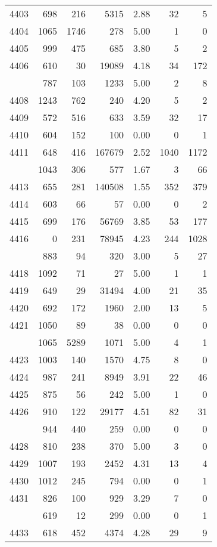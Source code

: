 \documentclass[
]{article}
\begin{document}
\begin{table}
\begin{tabular}[t]{lrrrrrr}
4403 & 698 & 216 & 5315 & 2.88 & 32 & 5\\
4404 & 1065 & 1746 & 278 & 5.00 & 1 & 0\\
4405 & 999 & 475 & 685 & 3.80 & 5 & 2\\
4406 & 610 & 30 & 19089 & 4.18 & 34 & 172\\
\addlinespace
4407 & 787 & 103 & 1233 & 5.00 & 2 & 8\\
4408 & 1243 & 762 & 240 & 4.20 & 5 & 2\\
4409 & 572 & 516 & 633 & 3.59 & 32 & 17\\
4410 & 604 & 152 & 100 & 0.00 & 0 & 1\\
4411 & 648 & 416 & 167679 & 2.52 & 1040 & 1172\\
\addlinespace
4412 & 1043 & 306 & 577 & 1.67 & 3 & 66\\
4413 & 655 & 281 & 140508 & 1.55 & 352 & 379\\
4414 & 603 & 66 & 57 & 0.00 & 0 & 2\\
4415 & 699 & 176 & 56769 & 3.85 & 53 & 177\\
4416 & 0 & 231 & 78945 & 4.23 & 244 & 1028\\
\addlinespace
4417 & 883 & 94 & 320 & 3.00 & 5 & 27\\
4418 & 1092 & 71 & 27 & 5.00 & 1 & 1\\
4419 & 649 & 29 & 31494 & 4.00 & 21 & 35\\
4420 & 692 & 172 & 1960 & 2.00 & 13 & 5\\
4421 & 1050 & 89 & 38 & 0.00 & 0 & 0\\
\addlinespace
4422 & 1065 & 5289 & 1071 & 5.00 & 4 & 1\\
4423 & 1003 & 140 & 1570 & 4.75 & 8 & 0\\
4424 & 987 & 241 & 8949 & 3.91 & 22 & 46\\
4425 & 875 & 56 & 242 & 5.00 & 1 & 0\\
4426 & 910 & 122 & 29177 & 4.51 & 82 & 31\\
\addlinespace
4427 & 944 & 440 & 259 & 0.00 & 0 & 0\\
4428 & 810 & 238 & 370 & 5.00 & 3 & 0\\
4429 & 1007 & 193 & 2452 & 4.31 & 13 & 4\\
4430 & 1012 & 245 & 794 & 0.00 & 0 & 1\\
4431 & 826 & 100 & 929 & 3.29 & 7 & 0\\
\addlinespace
4432 & 619 & 12 & 299 & 0.00 & 0 & 1\\
4433 & 618 & 452 & 4374 & 4.28 & 29 & 9\\

\end{tabular}
\end{table}
\end{document}
